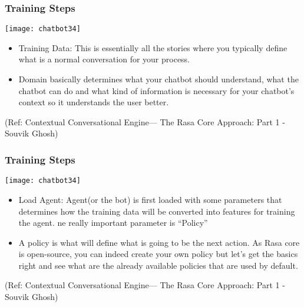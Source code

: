  \begin{frame}[fragile]\frametitle{Training Steps}
 

\begin{center}
\texttt{[image: chatbot34]}

\end{center}

\begin{itemize}
\item Training Data: This is essentially all the stories where you typically define what is a normal conversation for your process.
\item Domain basically determines what your chatbot should understand, what the chatbot can do and what kind of information is necessary for your chatbot's context so it understands the user better. 
\end{itemize}


\tiny{(Ref: Contextual Conversational Engine— The Rasa Core Approach: Part 1 - Souvik Ghosh)}

\end{frame}

 \begin{frame}[fragile]\frametitle{Training Steps}
 

\begin{center}
\texttt{[image: chatbot34]}

\end{center}

\begin{itemize}
\item Load Agent: Agent(or the bot) is first loaded with some parameters that determines how the training data will be converted into features for training the agent. ne really important parameter is ``Policy''
\item A policy is what will define what is going to be the next action. As Rasa core is open-source, you can indeed create your own policy but let's get the basics right and see what are the already available policies that are used by default.
\end{itemize}


\tiny{(Ref: Contextual Conversational Engine— The Rasa Core Approach: Part 1 - Souvik Ghosh)}

\end{frame}

